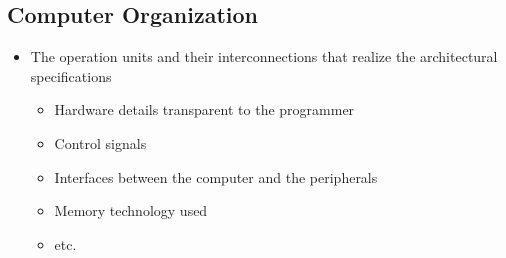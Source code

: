 \subsection*{Computer Organization}

\begin{itemize}
    \item The operation units and their interconnections that realize the architectural specifications
    \begin{itemize}
        \item Hardware details transparent to the programmer
        \item Control signals
        \item Interfaces between the computer and the peripherals
        \item Memory technology used
        \item etc.
    \end{itemize}
\end{itemize}




